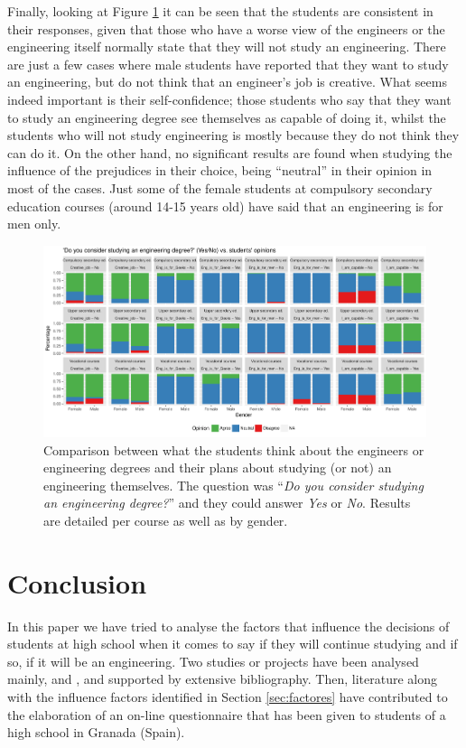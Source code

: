 \documentclass[journal,transmag]{IEEEtran}
\begin{document}
Finally, looking at Figure \ref{fig:futurevsopinion} it can be seen that the students are consistent in their responses, given that those who have a worse view of the engineers or the engineering itself normally state that they will not study an engineering. There are just a few cases where male students have reported that they want to study an engineering, but do not think that an engineer's job is creative. What seems indeed important is their self-confidence; those students who say that they want to study an engineering degree see themselves as capable of doing it, whilst the students who will not study engineering is mostly because they do not think they can do it. On the other hand, no significant results are found when studying the influence of the prejudices in their choice, being ``neutral'' in their opinion in most of the cases. Just some of the female students at compulsory secondary education courses (around 14-15 years old) have said that an engineering is for men only.

\begin{figure}
	\centering
	\includegraphics[width=1\textwidth]{img/future_vs_opinion.pdf}
	\caption{Comparison between what the students think about the engineers or engineering degrees and their plans about studying (or not) an engineering themselves. The question was ``\textit{Do you consider studying an engineering degree?}'' and they could answer \textit{Yes} or \textit{No}. Results are detailed per course as well as by gender.}
	\label{fig:futurevsopinion}
\end{figure}

\section{Conclusion}
\label{sec:conclusions}

In this paper we have tried to analyse the factors that influence the decisions of students at high school when it comes to say if they will continue studying and if so, if it will be an engineering. Two studies or projects have been analysed mainly, \cite{everis2012} and \cite{mtg2015}, and supported by extensive bibliography. Then, literature along with the influence factors identified in Section \ref{sec:factores} have contributed to the elaboration of an on-line questionnaire that has been given to students of a high school in Granada (Spain).
\end{document}
